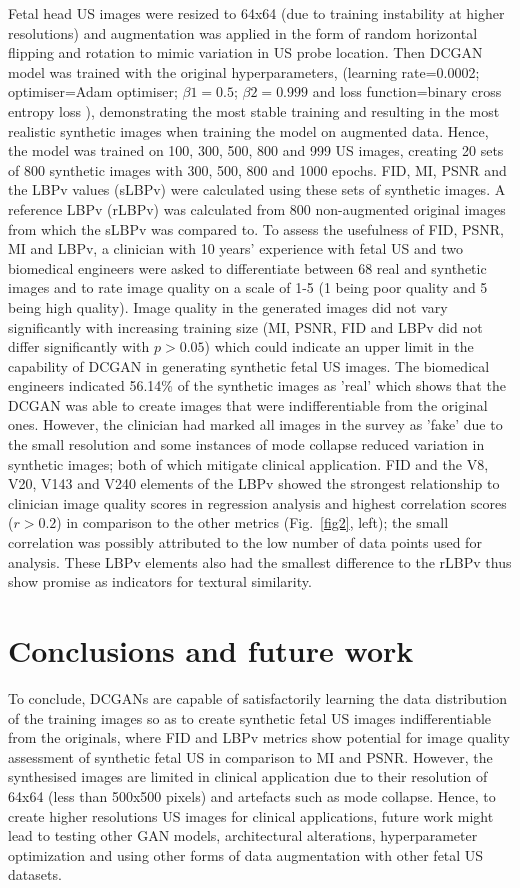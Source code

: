 \documentclass[runningheads]{llncs}
\begin{document}
Fetal head US images were resized to 64x64 (due to training instability at higher resolutions) and augmentation was applied in the form of random horizontal flipping and rotation to mimic variation in US probe location.
Then DCGAN model was trained with the original hyperparameters, (learning rate=0.0002; optimiser=Adam optimiser; $\beta1=0.5$; $\beta2= 0.999$ and loss function=binary cross entropy loss  \cite{radford2016unsupervised}), demonstrating the most stable training and resulting in the most realistic synthetic images when training the model on augmented data.
Hence, the model was trained on 100, 300, 500, 800 and 999 US images, creating 20 sets of 800 synthetic images with 300, 500, 800 and 1000 epochs.
FID, MI, PSNR and the LBPv values (sLBPv) were calculated using these sets of synthetic images.
A reference LBPv (rLBPv) was calculated from 800 non-augmented original images from which the sLBPv was compared to.
To assess the usefulness of FID, PSNR, MI and LBPv, a clinician with 10 years' experience with fetal US and two biomedical engineers were asked to differentiate between 68 real and synthetic images and to rate image quality on a scale of 1-5 (1 being poor quality and 5 being high quality).
Image quality in the generated images did not vary significantly with increasing training size (MI, PSNR, FID and LBPv did not differ significantly with $p>0.05$) which could indicate an upper limit in the capability of DCGAN in generating synthetic fetal US images.
The biomedical engineers indicated 56.14\% of the synthetic images as 'real' which shows that the DCGAN was able to create images that were indifferentiable from the original ones.
However, the clinician had marked all images in the survey as 'fake' due to the small resolution and some instances of mode collapse reduced variation in synthetic images; both of which mitigate clinical application.
FID and the V8, V20, V143 and V240 elements of the LBPv showed the strongest relationship to clinician image quality scores in regression analysis and highest correlation scores ($r>0.2$) in comparison to the other metrics (Fig.~\ref{fig2}, left); the small correlation was possibly attributed to the low number of data points used for analysis. These LBPv elements also had the smallest difference to the rLBPv thus show promise as indicators for textural similarity.


\section{Conclusions and future work}
To conclude, DCGANs are capable of satisfactorily learning the data distribution of the training images so as to create synthetic fetal US images indifferentiable from the originals, where FID and LBPv metrics show potential for image quality assessment of synthetic fetal US in comparison to MI and PSNR.
However, the synthesised images are limited in clinical application due to their resolution of 64x64 (less than 500x500 pixels) and artefacts such as mode collapse.
Hence, to create higher resolutions US images for clinical applications, future work might lead to testing other GAN models, architectural alterations, hyperparameter optimization and using other forms of data augmentation with other fetal US datasets.
\end{document}
